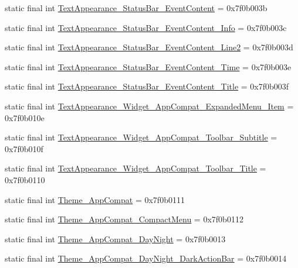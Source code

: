 \begin{CompactItemize}
static final int \hyperlink{classcom_1_1companyname_1_1x__2doo_1_1_r_1_1style_8b6e33ed73a1f3995b21ffa03829fdbf}{TextAppearance\_\-StatusBar\_\-EventContent} = 0x7f0b003b
\item 
static final int \hyperlink{classcom_1_1companyname_1_1x__2doo_1_1_r_1_1style_ffa65a7ccf0e5a282bafc23d080e0f85}{TextAppearance\_\-StatusBar\_\-EventContent\_\-Info} = 0x7f0b003c
\item 
static final int \hyperlink{classcom_1_1companyname_1_1x__2doo_1_1_r_1_1style_f988112483c59aae7ae371266e14721f}{TextAppearance\_\-StatusBar\_\-EventContent\_\-Line2} = 0x7f0b003d
\item 
static final int \hyperlink{classcom_1_1companyname_1_1x__2doo_1_1_r_1_1style_866ccf6c3022d6381210c608ed37c17b}{TextAppearance\_\-StatusBar\_\-EventContent\_\-Time} = 0x7f0b003e
\item 
static final int \hyperlink{classcom_1_1companyname_1_1x__2doo_1_1_r_1_1style_990792d500c0a482bc17f60a2ff086b6}{TextAppearance\_\-StatusBar\_\-EventContent\_\-Title} = 0x7f0b003f
\item 
static final int \hyperlink{classcom_1_1companyname_1_1x__2doo_1_1_r_1_1style_9933c628e03a1864fecdb5131f7f70c0}{TextAppearance\_\-Widget\_\-AppCompat\_\-ExpandedMenu\_\-Item} = 0x7f0b010e
\item 
static final int \hyperlink{classcom_1_1companyname_1_1x__2doo_1_1_r_1_1style_4130f889d20c9b5198450bc80707a68a}{TextAppearance\_\-Widget\_\-AppCompat\_\-Toolbar\_\-Subtitle} = 0x7f0b010f
\item 
static final int \hyperlink{classcom_1_1companyname_1_1x__2doo_1_1_r_1_1style_cfac6cecde893c65503785b21ffbd3df}{TextAppearance\_\-Widget\_\-AppCompat\_\-Toolbar\_\-Title} = 0x7f0b0110
\item 
static final int \hyperlink{classcom_1_1companyname_1_1x__2doo_1_1_r_1_1style_610fd8bb42f2c83be39a205b61b94577}{Theme\_\-AppCompat} = 0x7f0b0111
\item 
static final int \hyperlink{classcom_1_1companyname_1_1x__2doo_1_1_r_1_1style_329f1f0c1852114fe1103b0b05aba062}{Theme\_\-AppCompat\_\-CompactMenu} = 0x7f0b0112
\item 
static final int \hyperlink{classcom_1_1companyname_1_1x__2doo_1_1_r_1_1style_d51a9c2b49ed5f82b6c639c6550e69b2}{Theme\_\-AppCompat\_\-DayNight} = 0x7f0b0013
\item 
static final int \hyperlink{classcom_1_1companyname_1_1x__2doo_1_1_r_1_1style_7bd3b65b63cb3d95a7977eb28151fb49}{Theme\_\-AppCompat\_\-DayNight\_\-DarkActionBar} = 0x7f0b0014
\item 

\end{CompactItemize}
